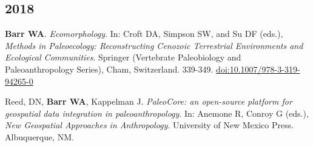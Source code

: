 \subsection*{2018}

\item {\bfseries Barr WA}. \emph{Ecomorphology}. In: Croft DA, Simpson SW, and Su DF (eds.), \emph{Methods in Paleoecology: Reconstructing Cenozoic Terrestrial Environments and Ecological Communities}. Springer (Vertebrate Paleobiology and Paleoanthropology Series), Cham, Switzerland.  339-349. \href{https://doi.org/10.1007/978-3-319-94265-0}{doi:10.1007/978-3-319-94265-0}

\item  Reed, DN, {\bfseries Barr WA}, Kappelman J. \emph{PaleoCore: an open-source platform for geospatial data integration in paleoanthropology}. In: Anemone R, Conroy G (eds.), \emph{New Geospatial Approaches in Anthropology}. University of New Mexico Press. Albuquerque, NM.